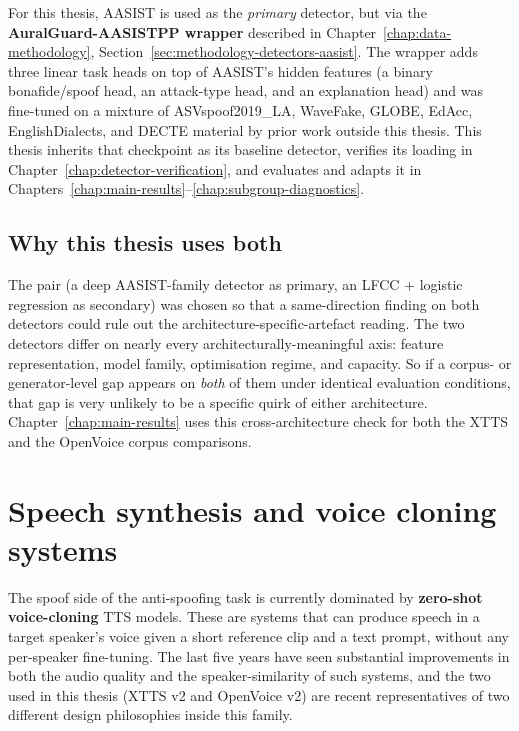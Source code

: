For this thesis, AASIST is used as the \emph{primary} detector,
but via the \textbf{AuralGuard-AASISTPP wrapper} described in
Chapter~\ref{chap:data-methodology},
Section~\ref{sec:methodology-detectors-aasist}. The wrapper adds
three linear task heads on top of AASIST's hidden features (a
binary bonafide/spoof head, an attack-type head, and an
explanation head) and was fine-tuned on a mixture of
ASVspoof2019\_LA, WaveFake, GLOBE, EdAcc, EnglishDialects, and
DECTE material by prior work outside this thesis. This thesis
inherits that checkpoint as its baseline detector, verifies its
loading in Chapter~\ref{chap:detector-verification}, and evaluates
and adapts it in Chapters~\ref{chap:main-results}--\ref{chap:subgroup-diagnostics}.

\subsection{Why this thesis uses both}
\label{sec:background-detectors-both}

The pair (a deep AASIST-family detector as primary, an LFCC +
logistic regression as secondary) was chosen so that a
same-direction finding on both detectors could rule out the
architecture-specific-artefact reading. The two detectors differ
on nearly every architecturally-meaningful axis: feature
representation, model family, optimisation regime, and capacity.
So if a corpus- or generator-level gap appears on \emph{both} of
them under identical evaluation conditions, that gap is very
unlikely to be a specific quirk of either architecture.
Chapter~\ref{chap:main-results} uses this cross-architecture check
for both the XTTS and the OpenVoice corpus comparisons.


\section{Speech synthesis and voice cloning systems}
\label{sec:background-generators}

The spoof side of the anti-spoofing task is currently dominated
by \textbf{zero-shot voice-cloning} TTS models. These are systems
that can produce speech in a target speaker's voice given a short
reference clip and a text prompt, without any per-speaker
fine-tuning. The last five years have seen substantial
improvements in both the audio quality and the speaker-similarity
of such systems, and the two used in this thesis (XTTS v2 and
OpenVoice v2) are recent representatives of two different design
philosophies inside this family.

